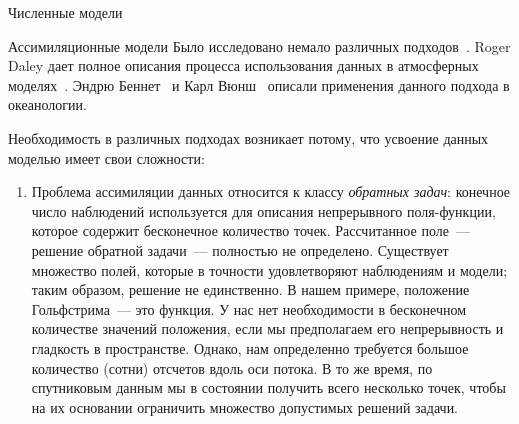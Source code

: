 \begin{chapter}{Численные модели}
\begin{section}{Ассимиляционные модели}
Было исследовано немало различных подходов~\cite{Malanotte-Rizzoli:1996}. 
Roger Daley дает полное описания процесса использования
данных в атмосферных моделях~\cite{Daley:1991}. 
Эндрю Беннет~\cite{Bennett:1992} и Карл Вюнш~\cite{Wunsch:1996} описали применения 
данного подхода в океанологии. 
%

Необходимость в различных подходах возникает потому, что усвоение данных%
 моделью имеет свои сложности:
%
\begin{enumerate}
\item
Проблема ассимиляции данных относится к классу
\emph{обратных задач}: конечное число наблюдений
используется для описания непрерывного поля-функции, которое содержит
бесконечное количество точек. Рассчитанное поле~--- решение обратной
задачи~--- полностью не определено. Существует множество полей, которые
в точности удовлетворяют наблюдениям и модели; таким образом, решение не
единственно. В нашем примере, положение 
Гольфстрима~--- это
функция. У нас нет необходимости в бесконечном количестве значений
положения, если мы предполагаем его непрерывность и гладкость в
пространстве. Однако, нам определенно требуется большое количество (сотни) 
отсчетов вдоль оси потока. В то же время, по спутниковым данным мы в состоянии
получить всего несколько точек, чтобы на их основании ограничить множество
допустимых решений задачи. 
%


\end{enumerate}
\end{section}
\end{chapter}
